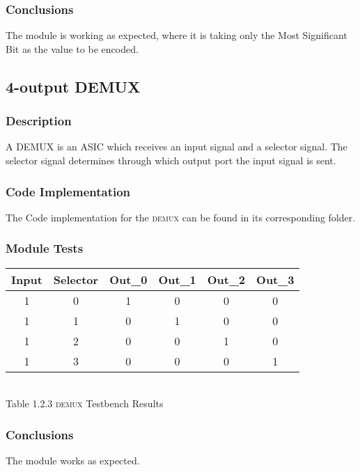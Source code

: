 \subsubsection{\color{orange}Conclusions}
The module is working as expected, where it is taking only the Most Significant Bit as the value to be encoded.

\subsection{\color{purple}4-output DEMUX}

\subsubsection{\color{orange}Description}
A DEMUX is an ASIC which receives an input signal and a selector signal. The selector signal determines through which output port the input signal is sent.

\subsubsection{\color{orange}Code Implementation}
The Code implementation for the \textsc{demux} can be found in its corresponding folder.

\subsubsection{\color{orange}Module Tests}

\begin{center}
\begin{tabular}{|c|c|c|c|c|c|}
\hline
Input&Selector&Out\_0&Out\_1&Out\_2&Out\_3\\
\hline
1&0&1&0&0&0\\
1&1&0&1&0&0\\
1&2&0&0&1&0\\
1&3&0&0&0&1\\
\hline
\end{tabular}
\\\vspace{12pt}
Table 1.2.3 \textsc{demux} Testbench Results
\end{center}

\subsubsection{\color{orange}Conclusions}
The module works as expected.